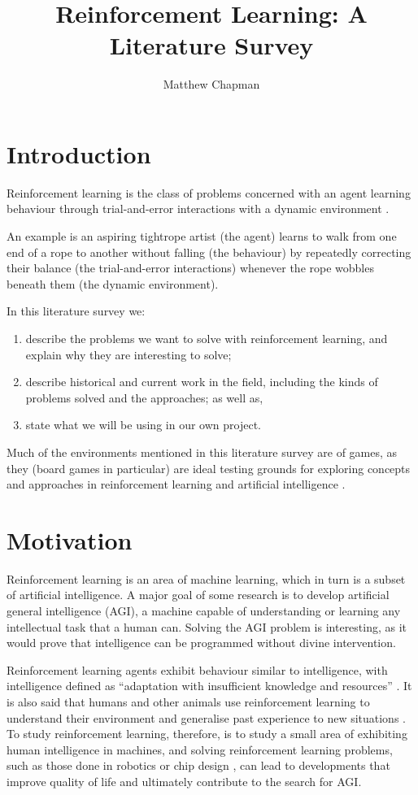 \documentclass{article}
\title{Reinforcement Learning: A Literature Survey}
\author{Matthew Chapman}
\begin{document}
\maketitle

\section{Introduction}
Reinforcement learning is the class of problems concerned with an agent learning behaviour through trial-and-error interactions with a dynamic environment \cite{Kaelbling1996}.

An example is an aspiring tightrope artist (the agent) learns to walk
from one end of a rope to another without falling (the behaviour) by
repeatedly correcting their balance (the trial-and-error interactions) whenever the rope wobbles beneath them (the dynamic environment).

In this literature survey we: 
\begin{enumerate}
  \item{describe the problems we want to solve with reinforcement learning, and explain why they are interesting to solve;} 
  \item{describe historical and current work in the field, including the kinds of problems solved and the approaches; as well as,} 
  \item{state what we will be using in our own project.}
\end{enumerate}

Much of the environments mentioned in this literature survey are of games, as they (board games in particular) are ideal testing grounds for exploring concepts and approaches in reinforcement learning and artificial intelligence \cite{Tesauro1995}.

\section{Motivation}
Reinforcement learning is an area of machine learning, which in turn is a subset of artificial intelligence. A major goal of some research is to develop artificial general intelligence (AGI), a machine capable of understanding or learning any intellectual task that a human can. Solving the AGI problem is interesting, as it would prove that intelligence can be programmed without divine intervention. 

Reinforcement learning agents exhibit behaviour similar to intelligence, with intelligence defined as ``adaptation with insufficient knowledge and resources'' \cite{OnDefiningArtificialIntelligence}. It is also said that humans and other animals use reinforcement learning to understand their environment and generalise past experience to new situations \cite{Mnih2015}. To study reinforcement learning, therefore, is to study a small area of exhibiting human intelligence in machines, and solving reinforcement learning problems, such as those done in robotics \cite{Kober2013} or chip design  \cite{Ipek2008}, can lead to developments that improve quality of life and ultimately contribute to the search for AGI.
\end{document}
